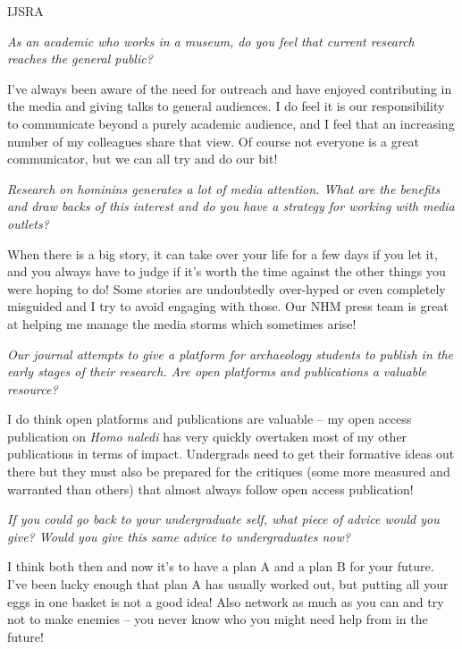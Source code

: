 \documentclass{ijsra}
\begin{document}
\begin{labeling}{IJSRA}
\item[IJSRA]
\emph{As an academic who works in a museum, do you feel that current research reaches the general public?}

\item[CS]
I’ve always been aware of the need for outreach and have enjoyed contributing in the media and
giving talks to general audiences.
I do feel it is our responsibility to communicate beyond a purely academic audience, and I feel that an increasing number of
my colleagues share that view. 
Of course not everyone is a great communicator, but we can all try and do our bit!

\item[IJSRA]
\emph{Research on hominins generates a lot of media attention.
What are the benefits and draw backs of this interest and do you have a strategy for working with media outlets?}

\item[CS]
When there is a big story, it can take over your life for a few days if you let it,
and you always have to judge if it’s worth the time against the other things you were hoping to do!
Some stories are undoubtedly over-hyped or even completely misguided and I try to avoid engaging with those.
Our NHM press team is great at helping me manage the media storms which sometimes arise!

\item[IJSRA]
\emph{Our journal attempts to give a platform for archaeology students to publish in the early stages of their research.
Are open platforms and publications a valuable resource?}

\item[CS]
I do think open platforms and publications are valuable – my open access publication on \emph{Homo naledi} has
very quickly overtaken most of my other publications in terms of impact.
Undergrads need to get their formative ideas out there but they must also be prepared for the critiques
(some more measured and warranted than others) that almost always follow open access publication!

\item[IJSRA]
\emph{If you could go back to your undergraduate self, what piece of advice would you give?
Would you give this same advice to undergraduates now?}

\item[CS]
I think both then and now it’s to have a plan A and a plan B for your future.
I’ve been lucky enough that plan A has usually worked out, but putting all your eggs in one basket is not a good idea!
Also network as much as you can and try not to make enemies – you never know who you might need help from in the future!

\end{labeling}
\vfill
\end{document}
